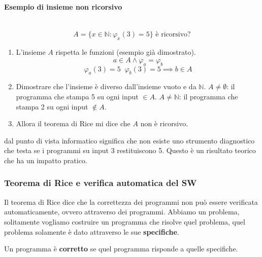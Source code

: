 \documentclass{article}
\begin{document}
\paragraph{Esempio di insieme non ricorsivo}\mbox{}\\
$$A=\{x\in\mathbb{N}:\varphi_x(3)=5\}\text{ è ricorsivo?}$$

\begin{enumerate}
    \item L'insieme $A$ rispetta le funzioni (esempio già dimostrato).
    $$a\in A\land \varphi_a=\varphi_b$$
    $$\varphi_a(3)=5\;\;\varphi_b(3)=5\implies b\in A$$
    \item Dimostrare che l'insieme è diverso dall'insieme vuoto e da $\mathbb{N}$.
    $A\neq\emptyset$: il programma che stampa 5 su ogni input $\in A$.
    $A\neq\mathbb{N}$: il programma che stampa 2 su ogni input $\notin A$.
    \item Allora il teorema di Rice mi dice che $A$ non è ricorsivo.
\end{enumerate}
dal punto di vista informatico significa che non esiste uno strumento diagnostico
che testa se i programmi su input 3 restituiscono 5. Questo è un risultato teorico
che ha un impatto pratico.

\subsubsection{Teorema di Rice e verifica automatica del SW}
Il teorema di Rice dice che la correttezza dei programmi non può essere verificata
automaticamente, ovvero attraverso dei programmi. Abbiamo un problema, solitamente
vogliamo costruire un programma che risolve quel problema, quel problema solamente
è dato attraverso le sue \textbf{specifiche}.

Un programma è \textbf{corretto} se quel programma risponde a quelle specifiche.
\end{document}
